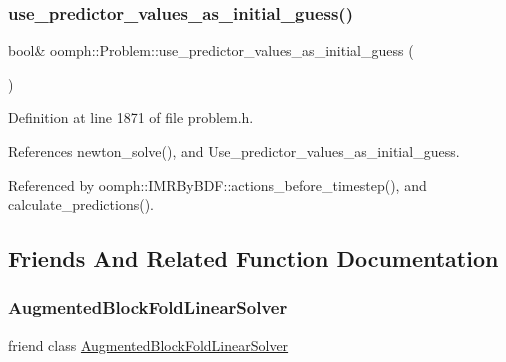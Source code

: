 \mbox{\label{classoomph_1_1Problem_a438bf1c7aafffda56f2acb34ba027fdb}} 
\subsubsection{\texorpdfstring{use\+\_\+predictor\+\_\+values\+\_\+as\+\_\+initial\+\_\+guess()}{use\_predictor\_values\_as\_initial\_guess()}}
{\footnotesize\ttfamily bool\& oomph\+::\+Problem\+::use\+\_\+predictor\+\_\+values\+\_\+as\+\_\+initial\+\_\+guess (\begin{DoxyParamCaption}{ }\end{DoxyParamCaption})\hspace{0.3cm}{\ttfamily [inline]}}



Definition at line 1871 of file problem.\+h.



References newton\+\_\+solve(), and Use\+\_\+predictor\+\_\+values\+\_\+as\+\_\+initial\+\_\+guess.



Referenced by oomph\+::\+I\+M\+R\+By\+B\+D\+F\+::actions\+\_\+before\+\_\+timestep(), and calculate\+\_\+predictions().



\subsection{Friends And Related Function Documentation}
\mbox{\label{classoomph_1_1Problem_a29d9c39e6a14d2a4cc4e0d7c716579fe}} 
\subsubsection{\texorpdfstring{Augmented\+Block\+Fold\+Linear\+Solver}{AugmentedBlockFoldLinearSolver}}
{\footnotesize\ttfamily friend class \hyperlink{classoomph_1_1AugmentedBlockFoldLinearSolver}{Augmented\+Block\+Fold\+Linear\+Solver}\hspace{0.3cm}{\ttfamily [friend]}}



